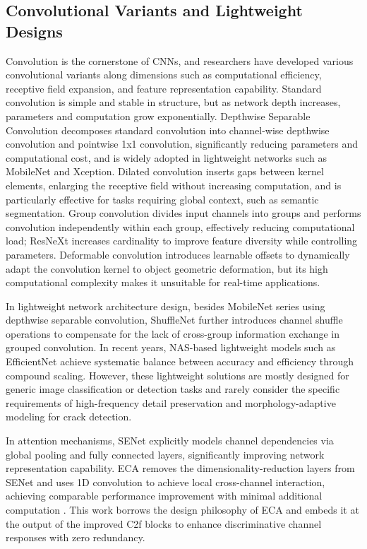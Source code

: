 \documentclass[twocolumn]{sn-jnl}
\begin{document}
	\subsection{Convolutional Variants and Lightweight Designs}
	Convolution is the cornerstone of CNNs, and researchers have developed various convolutional variants along dimensions such as computational efficiency, receptive field expansion, and feature representation capability. Standard convolution is simple and stable in structure, but as network depth increases, parameters and computation grow exponentially. Depthwise Separable Convolution decomposes standard convolution into channel-wise depthwise convolution and pointwise 1x1 convolution, significantly reducing parameters and computational cost, and is widely adopted in lightweight networks such as MobileNet and Xception. Dilated convolution inserts gaps between kernel elements, enlarging the receptive field without increasing computation, and is particularly effective for tasks requiring global context, such as semantic segmentation. Group convolution divides input channels into groups and performs convolution independently within each group, effectively reducing computational load; ResNeXt increases cardinality to improve feature diversity while controlling parameters. Deformable convolution introduces learnable offsets to dynamically adapt the convolution kernel to object geometric deformation, but its high computational complexity makes it unsuitable for real-time applications.
	
	In lightweight network architecture design, besides MobileNet series using depthwise separable convolution, ShuffleNet further introduces channel shuffle operations to compensate for the lack of cross-group information exchange in grouped convolution. In recent years, NAS-based lightweight models such as EfficientNet achieve systematic balance between accuracy and efficiency through compound scaling. However, these lightweight solutions are mostly designed for generic image classification or detection tasks and rarely consider the specific requirements of high-frequency detail preservation and morphology-adaptive modeling for crack detection.
	
	In attention mechanisms, SENet explicitly models channel dependencies via global pooling and fully connected layers, significantly improving network representation capability. ECA removes the dimensionality-reduction layers from SENet and uses 1D convolution to achieve local cross-channel interaction, achieving comparable performance improvement with minimal additional computation \cite{Wang2020}. This work borrows the design philosophy of ECA and embeds it at the output of the improved C2f blocks to enhance discriminative channel responses with zero redundancy.
	
\end{document}
